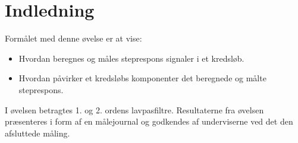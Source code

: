 

\section{Indledning}

Formålet med denne øvelse er at vise:

\begin{itemize}

\item Hvordan beregnes og måles steprespons signaler i et kredsløb.

\item Hvordan påvirker et kredsløbs komponenter det beregnede og målte steprespons.

\end{itemize}
I øvelsen betragtes 1. og 2. ordens lavpasfiltre.
Resultaterne fra øvelsen præsenteres i form af en målejournal og godkendes af underviserne ved det den afsluttede måling. 
